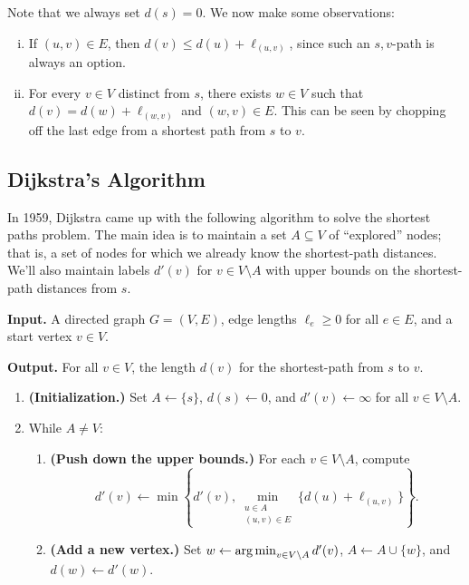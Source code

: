 Note that we always set $d(s) = 0$. We now make some observations: 
\begin{enumerate}[(i)]
    \item If $(u, v) \in E$, then $d(v) \leq d(u) + \ell_{(u,v)}$, since 
    such an $s, v$-path is always an option.
    \item For every $v \in V$ distinct from $s$, there exists $w \in V$ 
    such that $d(v) = d(w) + \ell_{(w, v)}$ and $(w, v) \in E$. This can 
    be seen by chopping off the last edge from a shortest path from $s$ to $v$.
\end{enumerate}

\subsection{Dijkstra's Algorithm}\label{subsec:1.3}
In 1959, Dijkstra came up with the following algorithm to solve the 
shortest paths problem. The main idea is to maintain a set $A \subseteq V$ 
of ``explored'' nodes; that is, a set of nodes for which we already know the 
shortest-path distances. We'll also maintain labels $d'(v)$ for $v \in 
V \setminus A$ with upper bounds on the shortest-path distances from $s$. 

\begin{mdframed}[
    linewidth=1pt,
    linecolor=black,
    bottomline=false,topline=false,rightline=false,
    innerrightmargin=0pt,innertopmargin=0pt,innerbottommargin=0pt,
    innerleftmargin=1em,%
    skipabove=0.75\baselineskip
]
{\bf Input.} A directed graph $G = (V, E)$, edge lengths $\ell_e \geq 0$ for 
all $e \in E$, and a start vertex $v \in V$. 

{\bf Output.} For all $v \in V$, the length $d(v)$ for the shortest-path from 
$s$ to $v$.
\begin{enumerate}[leftmargin=1.75cm, label={Step \arabic*.}]
    \item {\bf (Initialization.)} Set $A \gets \{s\}$, $d(s) \gets 0$, and $d'(v) \gets \infty$ 
    for all $v \in V \setminus A$.

    \item While $A \neq V$:
    \begin{enumerate}[label={Step 2.\arabic*.}]
        \item {\bf (Push down the upper bounds.)} For each $v \in V \setminus A$, compute 
        \[ d'(v) \gets \min\left\{ d'(v), \min_{\substack{u\in A \\ (u, v) \in E}} 
        \{ d(u) + \ell_{(u, v)} \} \right\}. \] 
        \item {\bf (Add a new vertex.)} Set $w \gets \operatorname*{arg\,min}_{v \in V \setminus A} d'(v)$, 
        $A \gets A \cup \{w\}$, and $d(w) \gets d'(w)$. 
    \end{enumerate}
\end{enumerate}
\end{mdframed}\vspace{-0.25cm}

